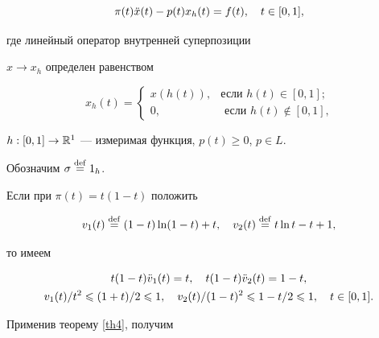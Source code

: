 \begin{equation}


\label{eq1}


\pi(t)\Ddot x(t)-p(t)x_h(t)=f(t),\q


t\in[0,1],


\end{equation}


где линейный оператор внутренней суперпозиции


$x\to x_h$ определен равенством


$$


x_h(t)=


\begin{cases}


x(h(t)),&\text{если $h(t)\in[0,1]$;}\\


0,&\text{ если $h(t)\notin[0,1]$,}


\end{cases}


$$


$h:[0,1]\to{\Bbb R}^1$ --- измеримая функция, $p(t)\ge0$, $p\in L$.


Обозначим $\sigma\overset{\mathrm{def}}{=}{}1_h$.





Если при $\pi(t)=t(1-t)$ положить


$$


v_1(t)\df(1-t)\ln(1-t)+t,\quad


v_2(t)\df t\ln t-t+1,


$$


то имеем


\begin{gather*}


t(1-t)\Ddot v_1(t)=t,\q t(1-t)\Ddot v_2(t)=1-t, \\


v_1(t)/t^2\le(1+t)/2\le1,\q v_2(t)/(1-t)^2\le1-t/2\le1,\q


t\in[0,1].


\end{gather*}


Применив теорему \ref{th4}, получим






